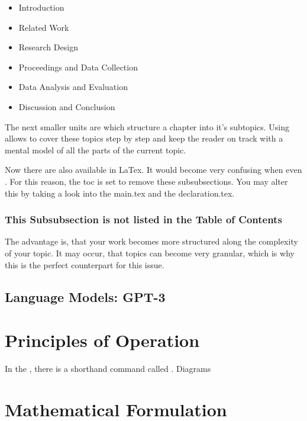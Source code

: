 \begin{itemize}
	\item Introduction
	\item Related Work
	\item Research Design
	\item Proceedings and Data Collection
	\item Data Analysis and Evaluation
	\item Discussion and Conclusion
\end{itemize}
\ThinHRule

The next smaller units are  which structure a chapter into it's subtopics. Using  allows to cover these topics step by step and keep the reader on track with a mental model of all the parts of the current topic.\\
\ThinHRule

Now there are also  available in LaTex. It would become very confusing when even . For this reason, the toc is set to remove these subsubsections. You may alter this by taking a look into the main.tex and the declaration.tex. 
\ThinHRule

\subsubsection{\textcolor{SECTION_COL}{This Subsubsection is not listed in the Table of Contents}}

The advantage is, that your work becomes more structured along the complexity of your topic. It may occur, that topics can become very granular, which is why this is the perfect counterpart for this issue.

\subsection{Language Models: GPT-3}


\section{Principles of Operation}

In the , there is a shorthand command called .
Diagrams

\section{Mathematical Formulation}

